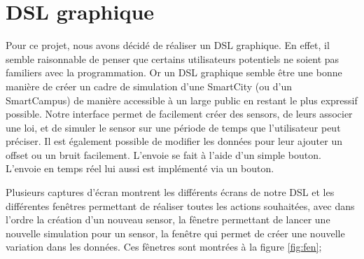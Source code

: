 \documentclass[11pt]{article}
\begin{document}
\section{DSL graphique}

Pour ce projet, nous avons décidé de réaliser un DSL graphique. En effet, il semble raisonnable de penser que certains utilisateurs potentiels ne soient pas familiers avec la programmation. Or un DSL graphique semble être une bonne manière de créer un cadre de simulation d'une SmartCity (ou d'un SmartCampus) de manière accessible à un large public en restant le plus expressif possible. Notre interface permet de facilement créer des sensors, de leurs associer une loi, et de simuler le sensor sur une période de temps que l'utilisateur peut préciser. Il est également possible de modifier les données pour leur ajouter un offset ou un bruit facilement. L'envoie se fait à l'aide d'un simple bouton. L'envoie en temps réel lui aussi est implémenté via un bouton.

Plusieurs captures d'écran montrent les différents écrans de notre DSL et les différentes fenêtres permettant de réaliser toutes les actions souhaitées, avec dans l'ordre la création d'un nouveau sensor, la fênetre permettant de lancer une nouvelle simulation pour un sensor, la fenêtre qui permet de créer une nouvelle variation dans les données. Ces fênetres sont montrées à la figure \ref{fig:fen};
\end{document}
